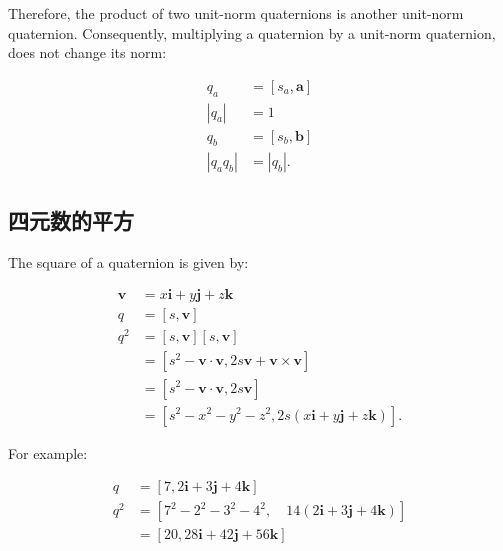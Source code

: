     Therefore, the product of two unit-norm quaternions is another unit-norm quaternion. Consequently, multiplying a quaternion by a unit-norm quaternion, does not change its norm:

    $$
        \begin{aligned}
            q_{a}                    & =\left[s_{a}, \mathbf{a}\right] \\
            \left|q_{a}\right|       & =1                              \\
            q_{b}                    & =\left[s_{b}, \mathbf{b}\right] \\
            \left|q_{a} q_{b}\right| & =\left|q_{b}\right| .
        \end{aligned}
    $$

    \subsection{四元数的平方}
    The square of a quaternion is given by:

    $$
        \begin{aligned}
            \mathbf{v} & =x \mathbf{i}+y \mathbf{j}+z \mathbf{k}                                                      \\
            q          & =[s, \mathbf{v}]                                                                             \\
            q^{2}      & =[s, \mathbf{v}][s, \mathbf{v}]                                                              \\
                       & =\left[s^{2}-\mathbf{v} \cdot \mathbf{v}, 2 s \mathbf{v}+\mathbf{v} \times \mathbf{v}\right] \\
                       & =\left[s^{2}-\mathbf{v} \cdot \mathbf{v}, 2 s \mathbf{v}\right]                              \\
                       & =\left[s^{2}-x^{2}-y^{2}-z^{2}, 2 s(x \mathbf{i}+y \mathbf{j}+z \mathbf{k})\right] .
        \end{aligned}
    $$

    For example:

    $$
        \begin{aligned}
            q     & =[7,2 \mathbf{i}+3 \mathbf{j}+4 \mathbf{k}]                                             \\
            q^{2} & =\left[7^{2}-2^{2}-3^{2}-4^{2}, \quad 14(2 \mathbf{i}+3 \mathbf{j}+4 \mathbf{k})\right] \\
                  & =[20,28 \mathbf{i}+42 \mathbf{j}+56 \mathbf{k}]
        \end{aligned}
    $$

